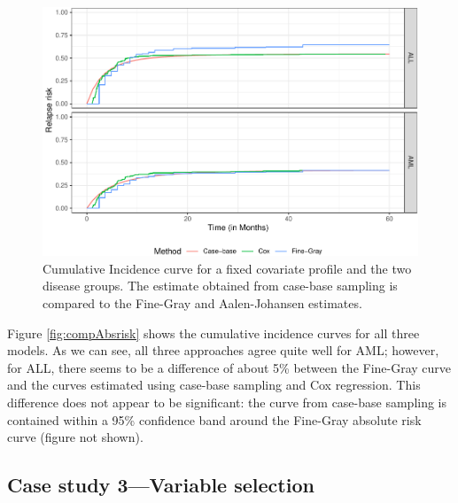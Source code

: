 \begin{Schunk}
\begin{figure}[ht]
\includegraphics[width=\textwidth,keepaspectratio=true]{./bmtcrr-risk-1} \caption{\label{fig:compAbsrisk} Cumulative Incidence curve for a fixed covariate profile and the two disease groups. The estimate obtained from case-base sampling is compared to the Fine-Gray and Aalen-Johansen estimates.}\label{fig:bmtcrr-risk}
\end{figure}
\end{Schunk}

Figure \ref{fig:compAbsrisk} shows the cumulative incidence curves for
all three models. As we can see, all three approaches agree quite well
for AML; however, for ALL, there seems to be a difference of about 5\%
between the Fine-Gray curve and the curves estimated using case-base
sampling and Cox regression. This difference does not appear to be
significant: the curve from case-base sampling is contained within a
95\% confidence band around the Fine-Gray absolute risk curve (figure
not shown).

\hypertarget{case-study-3variable-selection}{%
\subsection{Case study 3---Variable
selection}\label{case-study-3variable-selection}}

